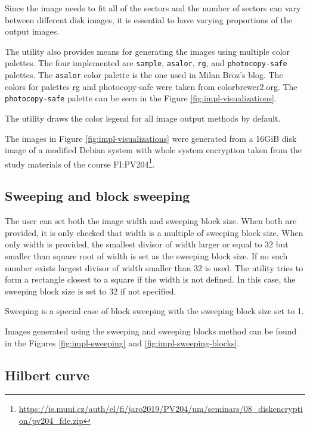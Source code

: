 \documentclass[
  digital, %
  color,   %
  oneside, %
  lof,     %
  nolot,     %
]{fithesis4}
\begin{document}
Since the image needs to fit all of the sectors and the number of sectors can vary between different disk images, it is essential to have varying proportions of the output images.

The utility also provides means for generating the images using multiple color palettes.
The four implemented are \texttt{sample}, \texttt{asalor}, \texttt{rg}, and \texttt{photocopy-safe} palettes.
The \texttt{asalor} color palette is the one used in Milan Broz's blog\cite{broz11}.
The colors for palettes rg and photocopy-safe were taken from colorbrewer2.org\cite{brewer02}.
The \texttt{photocopy-safe} palette can be seen in the Figure \ref{fig:impl-visualizations}.

The utility draws the color legend for all image output methods by default.

The images in Figure \ref{fig:impl-visualizations} were generated from a 16GiB disk image of a modified Debian system with whole system encryption taken from the study materials of the course FI:PV204\footnote{\url{https://is.muni.cz/auth/el/fi/jaro2019/PV204/um/seminars/08_diskencryption/pv204_fde.zip}}.

\subsection{Sweeping and block sweeping}
\label{ssec:sweeping-and-block-sweeping}

The user can set both the image width and sweeping block size.
When both are provided, it is only checked that width is a multiple of sweeping block size.
When only width is provided, the smallest divisor of width larger or equal to 32 but smaller than square root of width is set as the sweeping block size.
If no such number exists largest divisor of width smaller than 32 is used.
The utility tries to form a rectangle closest to a square if the width is not defined.
In this case, the sweeping block size is set to 32 if not specified.

Sweeping is a special case of block sweeping with the sweeping block size set to 1.

Images generated using the sweeping and sweeping blocks method can be found in the Figures \ref{fig:impl-sweeping} and \ref{fig:impl-sweeping-blocks}.

\subsection{Hilbert curve}
\label{ssec:hilbert-curve}
\end{document}
